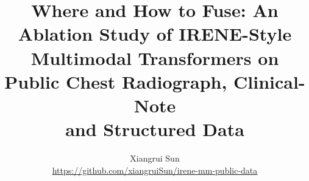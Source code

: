 \documentclass[10pt,twocolumn]{article}
\title{\vspace{-0.6cm}\Large\bfseries Where and How to Fuse: An Ablation Study of IRENE-Style\\Multimodal Transformers on Public Chest Radiograph, Clinical-Note\\and Structured Data\vspace{-0.2cm}}
\author{Xiangrui Sun\\{\small\url{https://github.com/xiangruiSun/irene-mm-public-data}}}
\date{}
\begin{document}
\maketitle




{\small


}

\appendix

\end{document}
